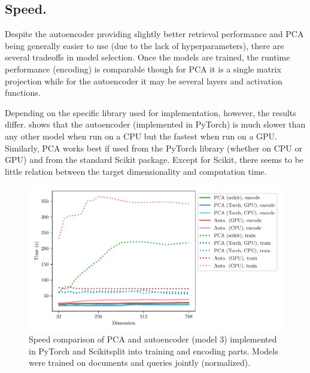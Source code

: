 \subsection{Speed.}

Despite the autoencoder providing slightly better retrieval performance and PCA being generally easier to use (due to the lack of hyperparameters), there are several tradeoffs in model selection.
Once the models are trained, the runtime performance (encoding) is comparable though for PCA it is a single matrix projection while for the autoencoder it may be several layers and activation functions.

Depending on the specific library used for implementation, however, the results differ.
 shows that the autoencoder (implemented in PyTorch) is much slower than any other model when run on a CPU but the fastest when run on a GPU.
Similarly, PCA works best if used from the PyTorch library (whether on CPU or GPU) and from the standard Scikit package.
Except for Scikit, there seems to be little relation between the target dimensionality and computation time.

\begin{figure}[ht]
    \center
    \includegraphics[width=\linewidth]{img/model_speed.pdf}
    \caption{Speed comparison of PCA and autoencoder (model 3) implemented in PyTorch and Scikit\protect\footnotemark split into training and encoding parts. Models were trained on documents and queries jointly (normalized).}
    \label{fig:model_speed}
\end{figure}

